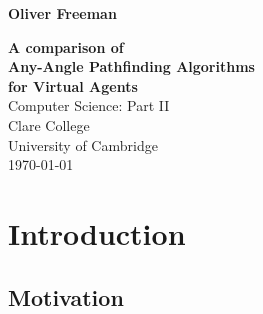 \documentclass[12pt,notitlepage]{report}
\begin{document}


\pagestyle{empty}

\hfill{\LARGE \bf Oliver Freeman}

\vspace*{60mm}
\begin{center}
\Huge
{\bf A comparison of \\Any-Angle Pathfinding Algorithms \\for Virtual Agents} \\
\vspace*{5mm}
Computer Science: Part II \\
\vspace*{5mm}
Clare College \\
University of Cambridge\\
\vspace*{5mm}
\today  %
\end{center}

\cleardoublepage


\setcounter{page}{1}
\pagestyle{plain}



\cleardoublepage

\tableofcontents

\listoffigures

\listoftables

\listofalgorithms




\cleardoublepage        %

\setcounter{page}{1}
\pagestyle{headings}
 
\cleardoublepage %

\chapter{Introduction}

\section{Motivation}
\end{document}
